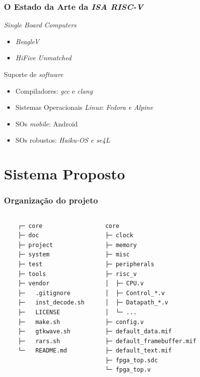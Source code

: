 \documentclass[aspectratio=169]{beamer}
\begin{document}
    \begin{frame}
        \frametitle{O Estado da Arte da \textit{ISA RISC-V}}
        \vfill
        \begin{block}{\textit{Single Board Computers}}
            \begin{itemize}
                \item \textit{BeagleV}
                \item \textit{HiFive Unmatched}
            \end{itemize}
        \end{block}
        \vfill
        \begin{block}{Suporte de \textit{software}}
            \begin{itemize}
                \item Compiladores: \textit{gcc} e \textit{clang}
                \item Sistemas Operacionais \textit{Linux}: \textit{Fedora e Alpine}
                \item SOs \textit{mobile}: Android
                \item SOs robustos: \textit{Haiku-OS e se4L}
            \end{itemize}
        \end{block}
        \vfill
    \end{frame}

\section{Sistema Proposto}
    \begin{frame}[fragile]
        \frametitle{Organização do projeto}
        \footnotesize{
        \begin{columns}
            \begin{verbatim}
    ┌─ core
    ├─ doc
    ├─ project
    ├─ system
    ├─ test
    ├─ tools
    ├─ vendor
    ├─   .gitignore
    ├─   inst_decode.sh
    ├─   LICENSE
    ├─   make.sh
    ├─   gtkwave.sh
    ├─   rars.sh
    └─   README.md
        \end{verbatim}
        \vfill
        \begin{verbatim}
   core
   ├─ clock
   ├─ memory
   ├─ misc
   ├─ peripherals
   ├─ risc_v
   │  ├─ CPU.v
   │  ├─ Control_*.v
   │  ├─ Datapath_*.v
   │  └─ ...
   ├─ config.v
   ├─ default_data.mif
   ├─ default_framebuffer.mif
   ├─ default_text.mif
   ├─ fpga_top.sdc
   └─ fpga_top.v
        \end{verbatim}
        \vfill
        \end{columns}}
    \end{frame}
\end{document}
